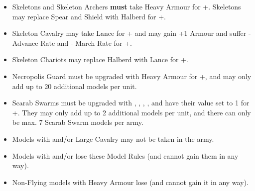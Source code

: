 \begin{itemize}[label={-}]
\item Skeletons and Skeleton Archers \textbf{must} take Heavy Armour for +\permodel{}. Skeletons may replace Spear and Shield with Halberd for +\permodel{}.

\item Skeleton Cavalry may take Lance for +\permodel{} and may gain +1 Armour and suffer - Advance Rate and - March Rate for +\permodel{}.

\item Skeleton Chariots may replace Halberd with Lance for +\permodel{}.

\item Necropolis Guard must be upgraded with Heavy Armour for +\permodel{}, and may only add up to 20 additional models per unit.

\item Scarab Swarms must be upgraded with \textbf{}, \textbf{}, \textbf{\ghoststep}, \textbf{\magicalattacks}, and have their \resurrected{} value set to 1 for +\permodel{}. They may only add up to 2 additional models per unit, and there can only be max. 7 Scarab Swarm models per army.

\item Models with \toweringpresence{} and/or Large Cavalry may not be taken in the army.

\item Models with \undergroundambush{} and/or \scout{} lose these Model Rules (and cannot gain them in any way).

\item Non-Flying models with Heavy Armour lose \lighttroops{} (and cannot gain it in any way).
\end{itemize}
